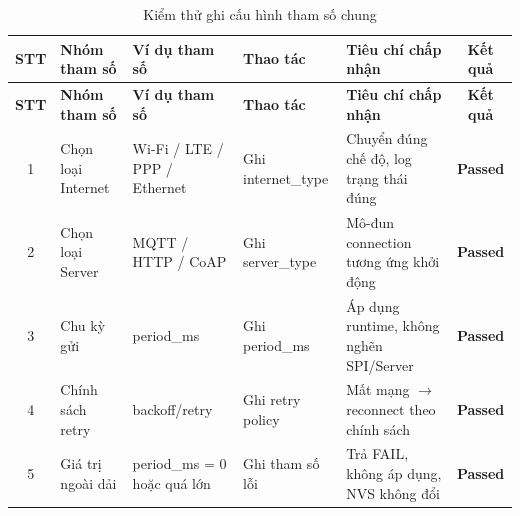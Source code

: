         \begin{longtable}{|c|p{}|p{}|p{}|p{}|c|}
            \caption{Kiểm thử ghi cấu hình tham số chung}
            \label{tab:test_write_config} \\
            \hline
            \textbf{STT} & \textbf{Nhóm tham số} & \textbf{Ví dụ tham số} & \textbf{Thao tác} & \textbf{Tiêu chí chấp nhận} & \textbf{Kết quả} \\ \hline
            \endfirsthead

            \hline
            \textbf{STT} & \textbf{Nhóm tham số} & \textbf{Ví dụ tham số} & \textbf{Thao tác} & \textbf{Tiêu chí chấp nhận} & \textbf{Kết quả} \\ \hline
            \endhead

            \hline
            \endfoot
            \endlastfoot

            1 & Chọn loại Internet & Wi-Fi / LTE / PPP / Ethernet & Ghi internet\_type & Chuyển đúng chế độ, log trạng thái đúng & \textcolor{modern_blue}{\textbf{Passed}} \\ \hline
            2 & Chọn loại Server & MQTT / HTTP / CoAP & Ghi server\_type & Mô-đun connection tương ứng khởi động & \textcolor{modern_blue}{\textbf{Passed}} \\ \hline
            3 & Chu kỳ gửi & period\_ms & Ghi period\_ms & Áp dụng runtime, không nghẽn SPI/Server & \textcolor{modern_blue}{\textbf{Passed}} \\ \hline
            4 & Chính sách retry & backoff/retry & Ghi retry policy & Mất mạng $\rightarrow$ reconnect theo chính sách & \textcolor{modern_blue}{\textbf{Passed}} \\ \hline
            5 & Giá trị ngoài dải & period\_ms = 0 hoặc quá lớn & Ghi tham số lỗi & Trả FAIL, không áp dụng, NVS không đổi & \textcolor{modern_blue}{\textbf{Passed}} \\ \hline
        \end{longtable}

        \newpage %

